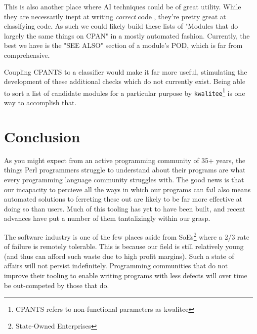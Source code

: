 \documentclass{article}
\begin{document}
This is also another place where AI techniques could be of great utility.
While they are necessarily inept at writing \textit{correct} code \cite{copilot}, they're pretty great at classifying code.
As such we could likely build these lists of "Modules that do largely the same things on CPAN" in a mostly automated fashion.
Currently, the best we have is the "SEE ALSO" section of a module's POD, which is far from comprehensive.

Coupling CPANTS to a classifier would make it far more useful, stimulating the development of these additional checks which do not currently exist.
Being able to sort a list of candidate modules for a particular purpose by \texttt{kwalitee}\footnote{CPANTS refers to non-functional parameters as kwalitee}
is one way to accomplish that.

\newpage
\section{Conclusion}

As you might expect from an active programming community of 35+ years, the things Perl programmers struggle to understand about their programs are what every programming language community struggles with.
The good news is that our incapacity to percieve all the ways in which our programs can fail also means automated solutions to ferreting these out are likely to be far more effective at doing so than users.
Much of this tooling has yet to have been built, and recent advances have put a number of them tantalizingly within our grasp.

The software industry is one of the few places aside from SoEs\footnote{State-Owned Enterprises} where a 2/3 rate of failure \cite{standish} is remotely tolerable.
This is because our field is still relatively young (and thus can afford such waste due to high profit margins).
Such a state of affairs will not persist indefinitely.
Programming communities that do not improve their tooling to enable writing programs with less defects will over time be out-competed by those that do.

\newpage


\end{document}
